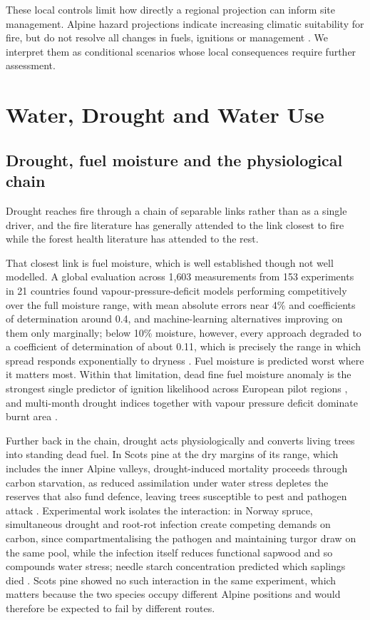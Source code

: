 \documentclass[11pt,a4paper]{article}
\begin{document}
These local controls limit how directly a regional projection can inform site management. Alpine hazard projections indicate increasing climatic suitability for fire, but do not resolve all changes in fuels, ignitions or management \citep{gerberding_mapping_2025}. We interpret them as conditional scenarios whose local consequences require further assessment.

\section{Water, Drought and Water Use}
\label{sec:water}

\subsection{Drought, fuel moisture and the physiological chain}

Drought reaches fire through a chain of separable links rather than as a single driver, and the fire literature has generally attended to the link closest to fire while the forest health literature has attended to the rest.

That closest link is fuel moisture, which is well established though not well modelled. A global evaluation across 1{,}603 measurements from 153 experiments in 21 countries found vapour-pressure-deficit models performing competitively over the full moisture range, with mean absolute errors near 4\% and coefficients of determination around 0.4, and machine-learning alternatives improving on them only marginally; below 10\% moisture, however, every approach degraded to a coefficient of determination of about 0.11, which is precisely the range in which spread responds exponentially to dryness \citep{rodrigues_vpdbased_2024}. Fuel moisture is predicted worst where it matters most. Within that limitation, dead fine fuel moisture anomaly is the strongest single predictor of ignition likelihood across European pilot regions \citep{gelabert_assessing_2025}, and multi-month drought indices together with vapour pressure deficit dominate burnt area \citep{miller_compounding_2025, beloiu_climatedriven_2026}.

Further back in the chain, drought acts physiologically and converts living trees into standing dead fuel. In Scots pine at the dry margins of its range, which includes the inner Alpine valleys, drought-induced mortality proceeds through carbon starvation, as reduced assimilation under water stress depletes the reserves that also fund defence, leaving trees susceptible to pest and pathogen attack \citep{giuggiola_droughtinduced_2010}. Experimental work isolates the interaction: in Norway spruce, simultaneous drought and root-rot infection create competing demands on carbon, since compartmentalising the pathogen and maintaining turgor draw on the same pool, while the infection itself reduces functional sapwood and so compounds water stress; needle starch concentration predicted which saplings died \citep{gomezgallego_interaction_2022}. Scots pine showed no such interaction in the same experiment, which matters because the two species occupy different Alpine positions and would therefore be expected to fail by different routes.
\end{document}
